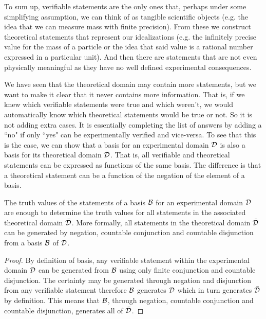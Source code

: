 \documentclass[11pt,letterpaper,fleqn]{memoir} %
\begin{document}
To sum up, verifiable statements are the only ones that, perhaps under some simplifying assumption, we can think of as tangible scientific objects (e.g. the idea that we can measure mass with finite precision). From these we construct theoretical statements that represent our idealizations (e.g. the infinitely precise value for the mass of a particle or the idea that said value is a rational number expressed in a particular unit). And then there are statements that are not even physically meaningful as they have no well defined experimental consequences.

We have seen that the theoretical domain may contain more statements, but we want to make it clear that it never contains more information. That is, if we knew which verifiable statements were true and which weren't, we would automatically know which theoretical statements would be true or not. So it is not adding extra cases. It is essentially completing the list of answers by adding a ``no" if only ``yes" can be experimentally verified and vice-versa. To see that this is the case, we can show that a basis for an experimental domain $\mathcal{D}$ is also a basis for its theoretical domain $\bar{\mathcal{D}}$. That is, all verifiable and theoretical statements can be expressed as functions of the same basis. The difference is that a theoretical statement can be a function of the negation of the element of a basis.

\begin{mathSection}
\begin{prop}\label{prop_basis_for_theoretical_domain}
	The truth values of the statements of a basis $\mathcal{B}$ for an experimental domain $\mathcal{D}$ are enough to determine the truth values for all statements in the associated theoretical domain $\bar{\mathcal{D}}$. More formally, all statements in the theoretical domain $\bar{\mathcal{D}}$ can be generated by negation, countable conjunction and countable disjunction from a basis $\mathcal{B}$ of $\mathcal{D}$.
\end{prop}

\begin{proof}
	By definition of basis, any verifiable statement within the experimental domain $\mathcal{D}$ can be generated from $\mathcal{B}$ using only finite conjunction and countable disjunction. The certainty may be generated through negation and disjunction from any verifiable statement therefore $\mathcal{B}$ generates $\mathcal{D}$ which in turn generates $\bar{\mathcal{D}}$ by definition. This means that $\mathcal{B}$, through negation, countable conjunction and countable disjunction, generates all of $\bar{\mathcal{D}}$.
\end{proof}
\end{mathSection}
\end{document}
